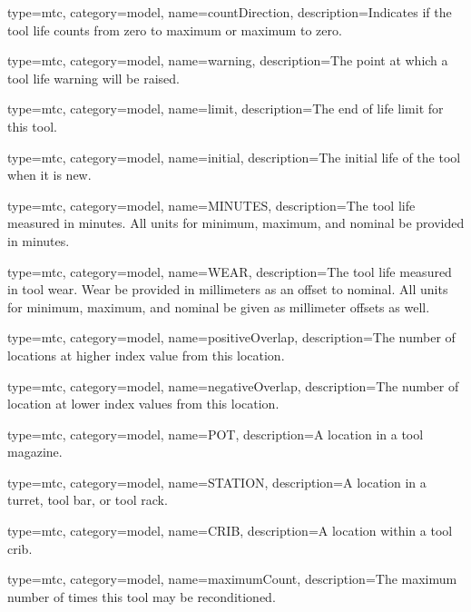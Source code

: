 {
  type=mtc,
  category=model,
  name={countDirection},
  description={Indicates if the tool life counts from zero to maximum or maximum to zero.}
}


{
  type=mtc,
  category=model,
  name={warning},
  description={The point at which a tool life warning will be raised.}
}


{
  type=mtc,
  category=model,
  name={limit},
  description={The end of life limit for this tool.}
}


{
  type=mtc,
  category=model,
  name={initial},
  description={The initial life of the tool when it is new.}
}


{
  type=mtc,
  category=model,
  name={MINUTES},
  description={The tool life measured in minutes. All units for minimum, maximum, and nominal \MUST be provided in minutes.}
}


{
  type=mtc,
  category=model,
  name={WEAR},
  description={The tool life measured in tool wear. Wear \MUST be provided in millimeters as an offset to nominal. All units for minimum, maximum, and nominal \MUST be given as millimeter offsets as well. }
}



{
  type=mtc,
  category=model,
  name={positiveOverlap},
  description={The number of locations at higher index value from this location.}
}


{
  type=mtc,
  category=model,
  name={negativeOverlap},
  description={The number of location at lower index values from this location.}
}


{
  type=mtc,
  category=model,
  name={POT},
  description={A location in a tool magazine.}
}


{
  type=mtc,
  category=model,
  name={STATION},
  description={A location in a turret, tool bar, or tool rack.}
}


{
  type=mtc,
  category=model,
  name={CRIB},
  description={A location within a tool crib.}
}


{
  type=mtc,
  category=model,
  name={maximumCount},
  description={The maximum number of times this tool may be reconditioned.}
}



